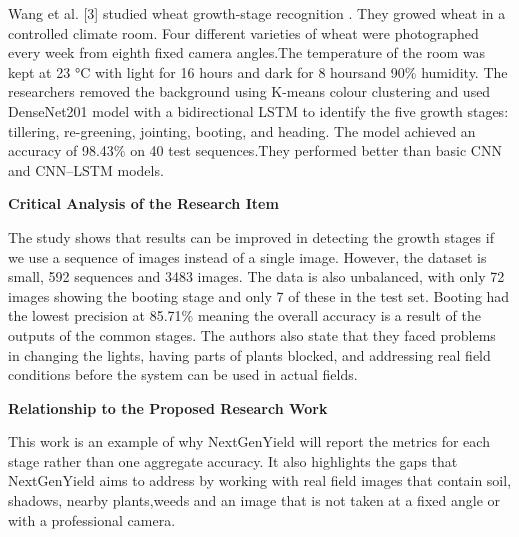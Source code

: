 \documentclass{FastFyp}
\begin{document}
Wang et al. [3] studied wheat growth-stage recognition . They growed wheat in a controlled climate room. Four different varieties of wheat were photographed every week from eighth fixed camera angles.The temperature of the room was kept at 23 °C with light for 16 hours and dark for 8 hoursand 90\% humidity. The researchers removed the background using K-means colour clustering and used DenseNet201 model with a bidirectional LSTM to identify the five growth stages: tillering, re-greening, jointing, booting, and heading. The model achieved an accuracy of 98.43\% on 40 test sequences.They performed better than basic CNN and CNN--LSTM models.

\textbf{Critical Analysis of the Research Item}

The study shows that results can be improved in detecting the growth stages if we use a sequence of images instead of a single image. However, the dataset is small, 592 sequences and 3483 images. The data is also unbalanced, with only 72 images showing the booting stage and only 7 of these in the test set. Booting had the lowest precision at 85.71\% meaning the overall accuracy is a result of the outputs of the common stages. The authors also state that they faced problems in changing the lights, having parts of plants blocked, and addressing real field conditions before the system can be used in actual fields.

\textbf{Relationship to the Proposed Research Work}

This work is an example of why NextGenYield will report the metrics for each stage rather than one aggregate accuracy. It also highlights the gaps that NextGenYield aims to address by working with real field images that contain soil, shadows, nearby plants,weeds and an image that is not taken at a fixed angle or with a professional camera. 
\end{document}
